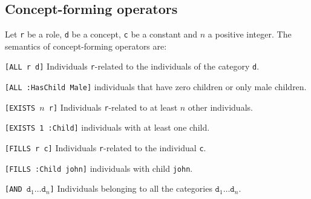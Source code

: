 \subsection{Concept-forming operators}
Let \texttt{r} be a role, \texttt{d} be a concept, \texttt{c} be a constant and $n$ a positive integer.
The semantics of concept-forming operators are:
\begin{descriptionlist}
    \item[\texttt{[ALL r d]}] 
        Individuals \texttt{r}-related to the individuals of the category \texttt{d}.
        \begin{example}
            \texttt{[ALL :HasChild Male]} individuals that have zero children or only male children.
        \end{example}
    
    \item[\texttt{[EXISTS $n$ r]}] 
        Individuals \texttt{r}-related to at least $n$ other individuals.
        \begin{example}
            \texttt{[EXISTS 1 :Child]} individuals with at least one child.
        \end{example}

    \item[\texttt{[FILLS r c]}] 
        Individuals \texttt{r}-related to the individual \texttt{c}.
        \begin{example}
            \texttt{[FILLS :Child john]} individuals with child \texttt{john}.
        \end{example}

    \item[\texttt{[AND $\texttt{d}_1 \dots \texttt{d}_n$]}] 
        Individuals belonging to all the categories $\texttt{d}_1 \dots \texttt{d}_n$.
\end{descriptionlist}


